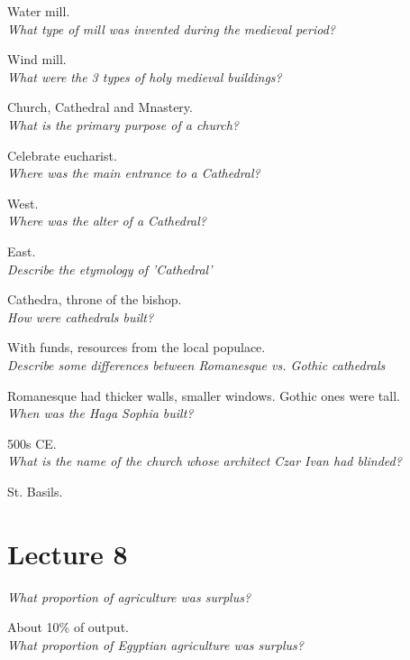 \documentclass[12pt]{article}
\begin{document}
Water mill.\\

\textit{What type of mill was invented during the medieval period?}

Wind mill.\\

\textit{What were the 3 types of holy medieval buildings?}

Church, Cathedral and Mnastery.\\

\textit{What is the primary purpose of a church?}

Celebrate eucharist.\\

\textit{Where was the main entrance to a Cathedral?}

West.\\

\textit{Where was the alter of a Cathedral?}

East.\\

\textit{Describe the etymology of 'Cathedral'}

Cathedra, throne of the bishop.\\

\textit{How were cathedrals built?}

With funds, resources from the local populace.\\

\textit{Describe some differences between Romanesque vs. Gothic cathedrals}

Romanesque had thicker walls, smaller windows. Gothic ones were tall.\\

\textit{When was the Haga Sophia built?}

500s CE.\\

\textit{What is the name of the church whose architect Czar Ivan had blinded?}

St. Basils.\\

\section*{Lecture 8}

\textit{What proportion of agriculture was surplus?}

About 10\% of output.\\

\textit{What proportion of Egyptian agriculture was surplus?}
\end{document}
